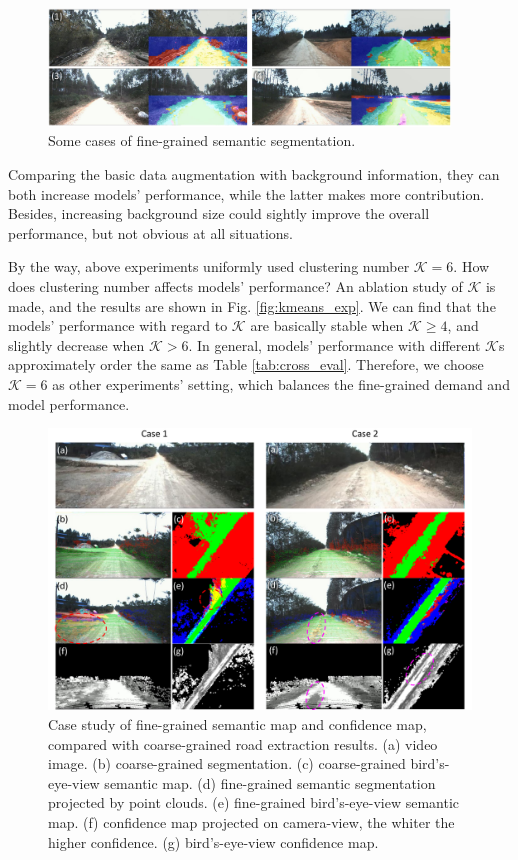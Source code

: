 \documentclass[letterpaper, 10 pt, conference]{ieeeconf}  %
\begin{document}
\begin{figure}[]
	\centering
	\includegraphics[width=0.95\textwidth]{semantic_segmentation.pdf}
	\caption{Some cases of fine-grained semantic segmentation.}
	\label{fig:semantic_segmentation}
\end{figure}

Comparing the basic data augmentation with background information, they can both increase models' performance, while the latter makes more contribution. Besides, increasing background size could sightly improve the overall performance, but not obvious at all situations.

By the way, above experiments uniformly used clustering number $\mathcal{K}=6$. How does clustering number affects models' performance? An ablation study of $\mathcal{K}$ is made, and the results are shown in Fig. \ref{fig:kmeans_exp}. We can find that the models' performance with regard to $\mathcal{K}$ are basically stable when $\mathcal{K} \geq 4$, and slightly decrease when $\mathcal{K}>6$. In general, models' performance with different $\mathcal{K}$s approximately order the same as Table \ref{tab:cross_eval}. Therefore, we choose $\mathcal{K}=6$ as other experiments' setting, which balances the fine-grained demand and model performance.

\begin{figure}[]
	\centering
	\includegraphics[width=\textwidth]{semantic_mapping.pdf}
	\caption{Case study of fine-grained semantic map and confidence map, compared with coarse-grained road extraction results. (a) video image. (b) coarse-grained segmentation. (c) coarse-grained bird's-eye-view semantic map. (d) fine-grained semantic segmentation projected by point clouds. (e) fine-grained bird's-eye-view semantic map. (f) confidence map projected on camera-view, the whiter the higher confidence. (g) bird's-eye-view confidence map.}
	\label{fig:semantic_mapping}
\end{figure}
\end{document}

